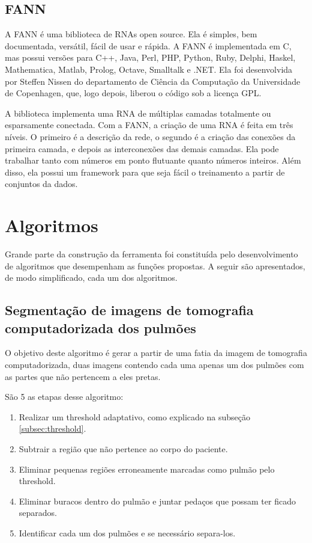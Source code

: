 \subsection{FANN}

A FANN %
 é uma biblioteca de RNAs open source. Ela é simples, bem documentada, versátil, fácil de usar e rápida. A FANN é implementada em C, mas possui versões para C++, Java, Perl, PHP, Python, Ruby, Delphi, Haskel, Mathematica, Matlab, Prolog, Octave, Smalltalk e .NET. Ela foi desenvolvida por Steffen Nissen do departamento de Ciência da Computação da Universidade de Copenhagen, que, logo depois, liberou o código sob a licença GPL.

A biblioteca implementa uma RNA de múltiplas camadas totalmente ou esparsamente conectada. Com a FANN, a criação de uma RNA é feita em três níveis. O primeiro é a descrição da rede, o segundo é a criação das conexões da primeira camada, e depois as interconexões das demais camadas. Ela pode trabalhar tanto com números em ponto flutuante quanto números inteiros. Além disso, ela possui um framework para que seja fácil o treinamento a partir de conjuntos da dados.

\section{Algoritmos}

Grande   parte  da   construção    da  ferramenta    foi constituída pelo desenvolvimento de algoritmos que desempenham as funções propostas. A seguir são apresentados, de modo simplificado, cada um dos algoritmos.

\subsection{Segmentação de imagens de tomografia computadorizada dos pulmões}

O objetivo deste algoritmo é gerar a partir de uma fatia da imagem de tomografia computadorizada, duas imagens contendo cada uma apenas um dos pulmões com as partes que não pertencem a eles pretas.

São 5 as etapas desse algoritmo:
\begin{enumerate}
 \item Realizar um threshold adaptativo, como explicado na subseção \ref{subsec:threshold}.
 \item Subtrair a região que não pertence ao corpo do paciente.
 \item Eliminar pequenas regiões erroneamente marcadas como pulmão pelo threshold.
 \item Eliminar buracos dentro do pulmão e juntar pedaços que possam ter ficado separados.
 \item Identificar cada um dos pulmões e se necessário separa-los.
\end{enumerate}

